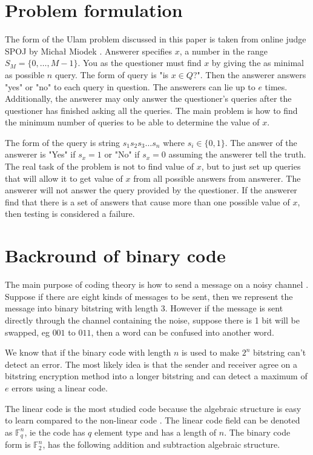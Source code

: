 \documentclass{TTP_DSL2006}
\begin{document}
\section{Problem formulation}

The form of the Ulam problem discussed in this paper is taken from online judge SPOJ by Micha\l{} Miodek \cite{guessn5}. Answerer specifies $x$, a number in the range $S_M = \{0, \ldots, M-1 \}$. You as the questioner must find $x$ by giving the as minimal as possible $n$ query. The form of query is "is $x \in Q$?". Then the answerer answers "yes" or "no" to each query in question. The answerers can lie up to $e$ times. Additionally, the answerer may only answer the questioner's queries after the questioner has finished asking all the queries. The main problem is how to find the minimum number of queries to be able to determine the value of $x$.

The form of the query is string $s_1s_2s_3\ldots s_n$ where $s_i \in \{0,1\}$. The answer of the answerer is "Yes" if $s_x = 1$ or "No" if $s_x = 0$ assuming the answerer tell the truth. The real task of the problem is not to find value of $x$, but to just set up queries that will allow it to get value of $x$ from all possible answers from answerer. The answerer will not answer the query provided by the questioner. If the answerer find that there is a set of answers that cause more than one possible value of $x$, then testing is considered a failure.

\section{Backround of binary code}

The main purpose of coding theory is how to send a message on a noisy channel \cite{VanLint2016}. Suppose if there are eight kinds of messages to be sent, then we represent the message into binary bitstring with length 3. However if the message is sent directly through the channel containing the noise, suppose there is 1 bit will be swapped, eg $001$ to $011$, then a word can be confused into another word.

We know that if the binary code with length $n$ is used to make $2^n$ bitstring can't detect an error. The most likely idea is that the sender and receiver agree on a bitstring encryption method into a longer bitstring and can detect a maximum of $e$ errors using a linear code.

The linear code is the most studied code because the algebraic structure is easy to learn compared to the non-linear code \cite{Huffman}. The linear code field can be denoted as $\mathbb{F}_q^n$, ie the code has $q$ element type and has a length of $n$. The binary code form is $\mathbb{F}_2^n $, has the following addition and subtraction algebraic structure.
\end{document}
